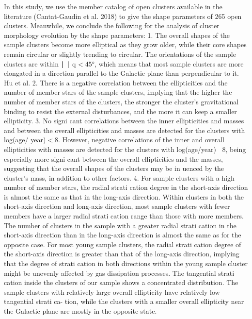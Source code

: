 \documentclass[../Main.tex]{subfiles}
\begin{document}
{In this study, we use the member catalog of open clusters
available in the literature (Cantat-Gaudin et al. 2018) to give
the shape parameters of 265 open clusters. Meanwhile, we
conclude the following for the analysis of cluster morphology
evolution by the shape parameters:
1. The overall shapes of the sample clusters become more
elliptical as they grow older, while their core shapes remain
circular or slightly trending to circular. The orientations of
the sample clusters are within ∣ ∣ q <45°, which means that
most sample clusters are more elongated in a direction
parallel to the Galactic plane than perpendicular to it.
Hu et al.
2. There is a negative correlation between the ellipticities
and the number of member stars of the sample clusters,
implying that the higher the number of member stars of
the clusters, the stronger the cluster’s gravitational
binding to resist the external disturbances, and the more
it can keep a smaller ellipticity.
3. No signi cant correlations between the inner ellipticities
and masses and between the overall ellipticities and
masses are detected for the clusters with log(age/
year)<8. However, negative correlations of the inner
and overall ellipticities with masses are detected for the
clusters with log(age/year) 8, being especially more
signi cant between the overall ellipticities and the
masses, suggesting that the overall shapes of the clusters
may be in uenced by the cluster’s mass, in addition to
other factors.
4. For sample clusters with a high number of member stars,
the radial strati cation degree in the short-axis direction is
almost the same as that in the long-axis direction. Within
clusters in both the short-axis direction and long-axis
direction, most sample clusters with fewer members have
a larger radial strati cation range than those with more
members. The number of clusters in the sample with a
greater radial strati cation in the short-axis direction than
in the long-axis direction is almost the same as for the
opposite case. For most young sample clusters, the radial
strati cation degree of the short-axis direction is greater
than that of the long-axis direction, implying that the
degree of strati cation in both directions within the
young sample cluster might be unevenly affected by gas
dissipation processes. The tangential strati cation inside
the clusters of our sample shows a concentrated
distribution. The sample clusters with relatively large
overall ellipticity have relatively low tangential strati ca-
tion, while the clusters with a smaller overall ellipticity
near the Galactic plane are mostly in the opposite state.
}
\end{document}
